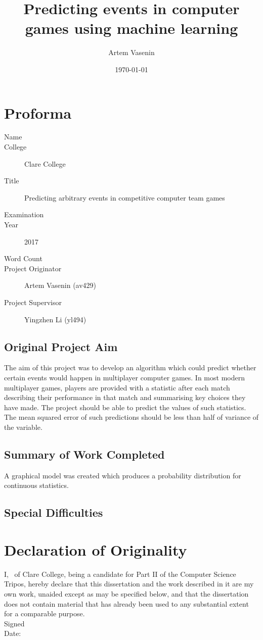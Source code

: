 \documentclass[12pt,a4paper]{report}
\title{Predicting events in computer games using machine learning}
\author{Artem Vasenin}
\date{\today}
\newcommand\college{Clare College}
\begin{document}
\maketitle

\section*{Proforma}
\begin{description}
\item[Name] \theauthor
\item[College] \college
\item[Title] Predicting arbitrary events in competitive computer team games
\item[Examination] %
\item[Year] 2017
\item[Word Count] %
\item[Project Originator] Artem Vasenin (av429)
\item[Project Supervisor] Yingzhen Li (yl494)
\end{description}

\subsection*{Original Project Aim}
The aim of this project was to develop an algorithm which could predict whether certain events would happen in multiplayer computer games.
In most modern multiplayer games, players are provided with a statistic after each match describing their performance in that match and summarising key choices they have made.
The project should be able to predict the values of such statistics.
The mean squared error of such predictions should be less than half of variance of the variable.
\subsection*{Summary of Work Completed}
A graphical model was created which produces a probability distribution for continuous statistics.
\subsection*{Special Difficulties}

\section*{Declaration of Originality}
I, \theauthor\ of \college, being a candidate for Part II of the Computer Science Tripos, hereby declare that this dissertation and the work described in it are my own work, unaided except as may be specified below, and that the dissertation does not contain material that has already been used to any substantial extent for a comparable purpose. %
\\[1\baselineskip]
\noindent Signed 
\\[1\baselineskip]
\noindent Date: \thedate
\end{document}
